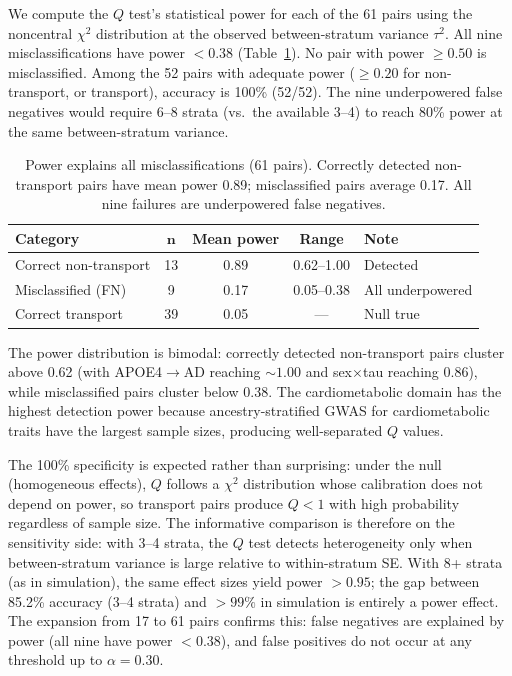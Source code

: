 \documentclass{article}
\begin{document}
We compute the $Q$ test's statistical power for each of the 61 pairs using the noncentral $\chi^2$ distribution at the observed between-stratum variance $\tau^2$. All nine misclassifications have power $< 0.38$ (Table~\ref{tab:realdata-power}). No pair with power $\geq 0.50$ is misclassified. Among the 52 pairs with adequate power ($\geq 0.20$ for non-transport, or transport), accuracy is 100\% (52/52). The nine underpowered false negatives would require 6--8 strata (vs.\ the available 3--4) to reach 80\% power at the same between-stratum variance.

\begin{table}[t]
\centering
\caption{Power explains all misclassifications (61 pairs). Correctly detected non-transport pairs have mean power 0.89; misclassified pairs average 0.17. All nine failures are underpowered false negatives.}
\label{tab:realdata-power}
\small
\begin{tabular}{@{}lcccl@{}}
\toprule
\textbf{Category} & $\boldsymbol{n}$ & \textbf{Mean power} & \textbf{Range} & \textbf{Note} \\
\midrule
Correct non-transport & 13 & 0.89 & 0.62--1.00 & Detected \\
Misclassified (FN) & 9 & 0.17 & 0.05--0.38 & All underpowered \\
Correct transport & 39 & 0.05 & --- & Null true \\
\bottomrule
\end{tabular}
\end{table}

The power distribution is bimodal: correctly detected non-transport pairs cluster above 0.62 (with APOE4$\to$AD reaching ${\sim}1.00$ and sex$\times$tau reaching $0.86$), while misclassified pairs cluster below 0.38. The cardiometabolic domain has the highest detection power because ancestry-stratified GWAS for cardiometabolic traits have the largest sample sizes, producing well-separated $Q$ values.

The 100\% specificity is expected rather than surprising: under the null (homogeneous effects), $Q$ follows a $\chi^2$ distribution whose calibration does not depend on power, so transport pairs produce $Q < 1$ with high probability regardless of sample size.
The informative comparison is therefore on the sensitivity side: with 3--4 strata, the $Q$ test detects heterogeneity only when between-stratum variance is large relative to within-stratum SE.
With 8+ strata (as in simulation), the same effect sizes yield power $> 0.95$; the gap between 85.2\% accuracy (3--4 strata) and $> 99\%$ in simulation is entirely a power effect.
The expansion from 17 to 61 pairs confirms this: false negatives are explained by power (all nine have power $< 0.38$), and false positives do not occur at any threshold up to $\alpha = 0.30$.
\end{document}
